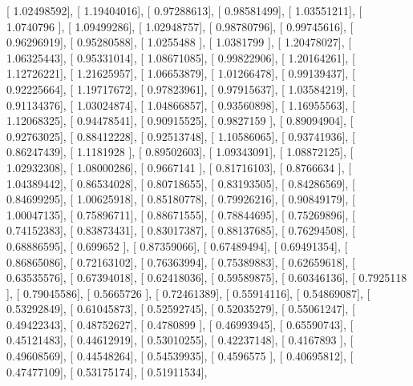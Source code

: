 \documentclass{article}
\begin{document}
       [ 1.02498592],
       [ 1.19404016],
       [ 0.97288613],
       [ 0.98581499],
       [ 1.03551211],
       [ 1.0740796 ],
       [ 1.09499286],
       [ 1.02948757],
       [ 0.98780796],
       [ 0.99745616],
       [ 0.96296919],
       [ 0.95280588],
       [ 1.0255488 ],
       [ 1.0381799 ],
       [ 1.20478027],
       [ 1.06325443],
       [ 0.95331014],
       [ 1.08671085],
       [ 0.99822906],
       [ 1.20164261],
       [ 1.12726221],
       [ 1.21625957],
       [ 1.06653879],
       [ 1.01266478],
       [ 0.99139437],
       [ 0.92225664],
       [ 1.19717672],
       [ 0.97823961],
       [ 0.97915637],
       [ 1.03584219],
       [ 0.91134376],
       [ 1.03024874],
       [ 1.04866857],
       [ 0.93560898],
       [ 1.16955563],
       [ 1.12068325],
       [ 0.94478541],
       [ 0.90915525],
       [ 0.9827159 ],
       [ 0.89094904],
       [ 0.92763025],
       [ 0.88412228],
       [ 0.92513748],
       [ 1.10586065],
       [ 0.93741936],
       [ 0.86247439],
       [ 1.1181928 ],
       [ 0.89502603],
       [ 1.09343091],
       [ 1.08872125],
       [ 1.02932308],
       [ 1.08000286],
       [ 0.9667141 ],
       [ 0.81716103],
       [ 0.8766634 ],
       [ 1.04389442],
       [ 0.86534028],
       [ 0.80718655],
       [ 0.83193505],
       [ 0.84286569],
       [ 0.84699295],
       [ 1.00625918],
       [ 0.85180778],
       [ 0.79926216],
       [ 0.90849179],
       [ 1.00047135],
       [ 0.75896711],
       [ 0.88671555],
       [ 0.78844695],
       [ 0.75269896],
       [ 0.74152383],
       [ 0.83873431],
       [ 0.83017387],
       [ 0.88137685],
       [ 0.76294508],
       [ 0.68886595],
       [ 0.699652  ],
       [ 0.87359066],
       [ 0.67489494],
       [ 0.69491354],
       [ 0.86865086],
       [ 0.72163102],
       [ 0.76363994],
       [ 0.75389883],
       [ 0.62659618],
       [ 0.63535576],
       [ 0.67394018],
       [ 0.62418036],
       [ 0.59589875],
       [ 0.60346136],
       [ 0.7925118 ],
       [ 0.79045586],
       [ 0.5665726 ],
       [ 0.72461389],
       [ 0.55914116],
       [ 0.54869087],
       [ 0.53292849],
       [ 0.61045873],
       [ 0.52592745],
       [ 0.52035279],
       [ 0.55061247],
       [ 0.49422343],
       [ 0.48752627],
       [ 0.4780899 ],
       [ 0.46993945],
       [ 0.65590743],
       [ 0.45121483],
       [ 0.44612919],
       [ 0.53010255],
       [ 0.42237148],
       [ 0.4167893 ],
       [ 0.49608569],
       [ 0.44548264],
       [ 0.54539935],
       [ 0.4596575 ],
       [ 0.40695812],
       [ 0.47477109],
       [ 0.53175174],
       [ 0.51911534],
\end{document}

